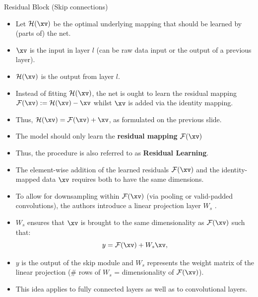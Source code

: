 \documentclass[11pt,compress,t,notes=noshow, xcolor=table]{beamer}
\begin{document}
\begin{vbframe}{Residual Block (Skip connections)}
\framebreak
    \begin{itemize}
        \item Let $\mathcal{H}(\xv)$ be the optimal underlying mapping that should be learned by (parts of) the net.
        \item $\xv$ is the input in layer $l$ (can be raw data input or the output of a previous layer).
        \item $\mathcal{H}(\xv)$ is the output from layer $l$.
        \item Instead of fitting $\mathcal{H}(\xv)$, the net is ought to learn the residual mapping $\mathcal{F}(\xv):=\mathcal{H}(\xv)-\xv$ whilst $\xv$ is added via the identity mapping.
        \item Thus, $\mathcal{H}(\xv) = \mathcal{F}(\xv) + \xv$, as formulated on the previous slide.
        \item The model should only learn the \textbf{residual mapping} $\mathcal{F}(\xv)$ 
        \item Thus, the procedure is also referred to as \textbf{Residual Learning}.
    \end{itemize}
\framebreak
    \begin{itemize}
        \item The element-wise addition of the learned residuals $\mathcal{F}(\xv)$ and the identity-mapped data $\xv$ requires both to have the same dimensions.
        \item To allow for downsampling within $\mathcal{F}(\xv)$ (via pooling or valid-padded convolutions), the authors introduce a linear projection layer $W_s$ .
        \item $W_s$ ensures that $\xv$ is brought to the same dimensionality as $\mathcal{F}(\xv)$ such that:
        $$
            y = \mathcal{F}(\xv) + W_s\xv,
        $$
        \item $y$ is the output of the skip module and $W_s$ represents the weight matrix of the linear projection (\# rows of $W_s$ = dimensionality of $\mathcal{F}(\xv)$).
        \item This idea applies to fully connected layers as well as to convolutional layers.
    \end{itemize}
\end{vbframe}

  \framebreak
\end{document}
